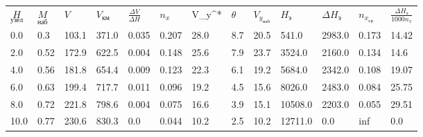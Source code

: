 \begin{tabular}{lllllllllllll}
$\underset{узел}{H}$ & $\underset{наб}{M}$ & $V$ & $V_{км}$ & $\frac{\Delta V}{\Delta H}$ & $n_x$ & V_{y}^* & $\theta$ & $V_{y_{наб}}$ & $H_э$ & $\Delta H_э$ & $n_{x_{ср}}$ & $\frac{\Delta H_{э}}{1000 n_x}$ \\
0.0 & 0.3 & 103.1 & 371.0 & 0.035 & 0.207 & 28.0 & 8.7 & 20.5 & 541.0 & 2983.0 & 0.173 & 14.42 \\
2.0 & 0.52 & 172.9 & 622.5 & 0.004 & 0.148 & 25.6 & 7.9 & 23.7 & 3524.0 & 2160.0 & 0.134 & 14.6 \\
4.0 & 0.56 & 181.8 & 654.4 & 0.009 & 0.123 & 22.3 & 6.1 & 19.2 & 5684.0 & 2342.0 & 0.108 & 19.07 \\
6.0 & 0.63 & 199.4 & 717.7 & 0.011 & 0.096 & 19.2 & 4.5 & 15.6 & 8026.0 & 2483.0 & 0.084 & 25.75 \\
8.0 & 0.72 & 221.8 & 798.6 & 0.004 & 0.075 & 16.6 & 3.9 & 15.1 & 10508.0 & 2203.0 & 0.055 & 29.51 \\
10.0 & 0.77 & 230.6 & 830.3 & 0.0 & 0.044 & 10.2 & 2.5 & 10.2 & 12711.0 & 0.0 & inf & 0.0 \\
\end{tabular}
